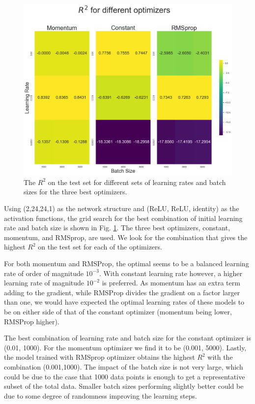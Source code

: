 \begin{figure}[h!]
    \centering
    \includegraphics[width=1.0\linewidth]{project_2/figures/r2_grid_cont.png}
    \caption{The $R^2$ on the test set for different sets of learning rates and batch sizes for the three best optimizers.}
    \label{fig:grid_franke}
\end{figure}

Using (2,24,24,1) as the network structure and (ReLU, ReLU, identity) as the activation functions, the grid search for the best combination of initial learning rate and batch size is shown in Fig. \ref{fig:grid_franke}. The three best optimizers, constant, momentum, and RMSprop, are used. 
We look for the combination that gives the highest $R^2$ on the test set for each of the optimizers. 

For both momentum and RMSProp, the optimal seems to be a balanced learning rate of order of magnitude $10^{-3}$.
With constant learning rate however, a higher learning rate of magnitude $10^{-2}$ is preferred.
As momentum has an extra term adding to the gradient, while RMSProp divides the gradient on a factor larger than one, we would have expected the optimal learning rates of these models to be on either side of that of the constant optimizer (momentum being lower, RMSProp higher).

The best combination of learning rate and batch size for the constant optimizer is (0.01, 1000). For the momentum optimizer we find it to be (0.001, 5000). Lastly, the model trained with RMSprop optimizer obtains the highest $R^2$ with the combination (0.001,1000). 
The impact of the batch size is not very large, which could be due to the case that 1000 data points is enough to get a representative subset of the total data.
Smaller batch sizes performing slightly better could be due to some degree of randomness improving the learning steps.


